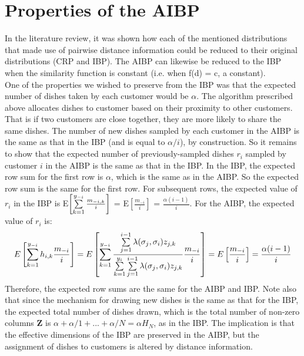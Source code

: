 \section{Properties of the AIBP}
In the literature review, it was shown how each of the mentioned distributions
that made use of pairwise distance information could be reduced to their original
distributions (CRP and IBP). The AIBP can likewise be reduced to the IBP when
the similarity function is constant (i.e. when f(d) = c, a constant).\\

\noindent
One of the properties we wished to preserve from the IBP was that the expected
number of dishes taken by each customer would be $\alpha$. The algorithm
prescribed above allocates dishes to customer based on their proximity to other
customers.  That is if two customers are close together, they are more likely
to share the same dishes. The number of new dishes sampled by each customer in
the AIBP is the same as that in the IBP (and is equal to $\alpha/i$), by
construction. So it remains to show that the expected number of
previously-sampled dishes $r_i$ sampled by customer $i$ in the AIBP is the
same as that in the IBP. In the IBP, the expected row sum for the first row is
$\alpha$, which is the same as in the AIBP. So the expected row sum is the same
for the first row. For subsequent rows, the expected value of $r_i$ in the IBP
is E$\left[\sum\limits_{k=1}^{y_{-i}} \frac{m_{-i,k}}{i}\right]$ =
E$\left[\frac{m_{-i}}{i}\right]$ = $\frac{\alpha(i-1)}{i}$. For the AIBP, the
expected value of $r_i$ is:
\[
  E\left[\sum\limits_{k=1}^{y_{-i}} h_{i,k} \frac{m_{-i}}{i}\right] = 
  E\left[\sum\limits_{k=1}^{y_{-i}}\displaystyle\frac{\sum\limits_{j=1}^{i-1}\lambda(\sigma_j,\sigma_i)z_{j,k}} {\sum\limits_{k=1}^{y_i}\sum\limits_{j=1}^{i-1}\lambda(\sigma_j,\sigma_i)z_{j,k}} \frac{m_{-i}}{i}\right] = 
  E\left[\frac{m_{-i}}{i}\right] = \frac{\alpha(i-1)}{i}
\]
Therefore, the expected row sums are the same for the AIBP and IBP. Note also
that since the mechanism for drawing new dishes is the same as that for the
IBP, the expected total number of dishes drawn, which is the total number of
non-zero columns $\bm Z$ is $\alpha+\alpha/1+...+\alpha/N = \alpha H_N$, as in
the IBP.  The implication is that the effective dimensions of the IBP are
preserved in the AIBP, but the assignment of dishes to customers is altered
by distance information.\\

